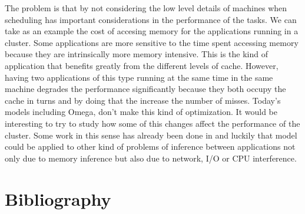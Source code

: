 \documentclass{article}                     %
\begin{document}
The problem is that by not considering the low level details of
machines when scheduling has important considerations in the
performance of the tasks. We can take as an example the cost of
accesing memory for the applications running in a cluster.  Some
applications are more sensitive to the time spent accessing memory
because they are intrinsically more memory intensive. This is the kind
of application that benefits greatly from the different levels of
cache. However, having two applications of this type running at the
same time in the same machine degrades the performance significantly
because they both occupy the cache in turns and by doing that the
increase the number of misses. Today's models including Omega, don't
make this kind of optimization. It would be interesting to try to study 
how some of this changes affect the performance of the cluster. Some
work in this sense has already been done in \cite{_firmament_????} and luckily that
model could be applied to other kind of problems of inference
between applications not only due to memory inference but also due to
network, I/O or CPU interference.

\section{Bibliography}


\printbibliography
\end{document}

